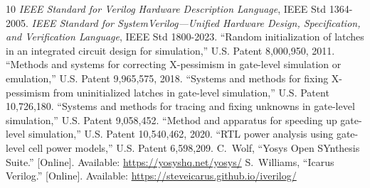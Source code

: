 \documentclass[journal]{IEEEtran}
\begin{document}
\begin{thebibliography}{10}
 \emph{IEEE Standard for Verilog Hardware Description Language},
IEEE Std 1364-2005.
 \emph{IEEE Standard for SystemVerilog---Unified Hardware Design,
Specification, and Verification Language}, IEEE Std 1800-2023.
 ``Random initialization of latches in an integrated circuit design
for simulation,'' U.S. Patent 8{,}000{,}950, 2011.
 ``Methods and systems for correcting X-pessimism in gate-level
simulation or emulation,'' U.S. Patent 9{,}965{,}575, 2018.
 ``Systems and methods for fixing X-pessimism from uninitialized
latches in gate-level simulation,'' U.S. Patent 10{,}726{,}180.
 ``Systems and methods for tracing and fixing unknowns in gate-level
simulation,'' U.S. Patent 9{,}058{,}452.
 ``Method and apparatus for speeding up gate-level simulation,''
U.S. Patent 10{,}540{,}462, 2020.
 ``RTL power analysis using gate-level cell power models,''
U.S. Patent 6{,}598{,}209.
 C.~Wolf, ``Yosys Open SYnthesis Suite.'' [Online]. Available:
\url{https://yosyshq.net/yosys/}
 S.~Williams, ``Icarus Verilog.'' [Online]. Available:
\url{https://steveicarus.github.io/iverilog/}
\end{thebibliography}
\end{document}
